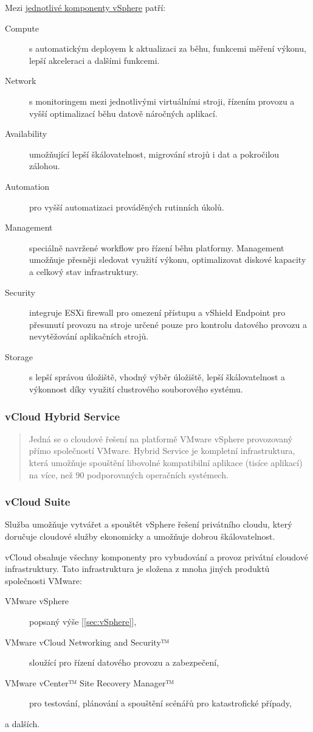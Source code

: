 Mezi \href{http://www.vmware.com/products/vsphere/features.html}{jednotlivé komponenty vSphere} patří:
\begin{description}
	\item[Compute] s automatickým deployem k aktualizaci za běhu, funkcemi měření výkonu, lepší akceleraci a dalšími funkcemi.
	\item[Network] s monitoringem mezi jednotlivými virtuálními stroji, řízením provozu a vyšší optimalizací běhu datově náročných aplikací.
	\item[Availability] umožňující lepší škálovatelnost, migrování strojů i dat a pokročilou zálohou.
	\item[Automation] pro vyšší automatizaci prováděných rutinních úkolů.
	\item[Management] speciálně navržené workflow pro řízení běhu platformy. Management umožňuje přesněji sledovat využití výkonu, optimalizovat diskové kapacity a celkový stav infrastruktury.
	\item[Security] integruje ESXi firewall pro omezení přístupu a vShield Endpoint pro přesunutí provozu na stroje určené pouze pro kontrolu datového provozu a nevytěžování aplikačních strojů.
	\item[Storage] s lepší správou úložiště, vhodný výběr úložiště, lepší škálovatelnost a výkonnost díky využití clustrového souborového systému.
\end{description}

\subsubsection{vCloud Hybrid Service}
\begin{quote}
Jedná se o cloudové řešení na platformě VMware vSphere provozovaný přímo společností VMware. Hybrid Service je kompletní infrastruktura, která umožňuje spouštění libovolné kompatibilní aplikace (tisíce aplikací) na více, než 90 podporovaných operačních systémech.\cite{vmware:hybridService}
\end{quote}

\subsubsection{vCloud Suite}
Služba umožňuje vytvářet a spouštět vSphere řešení privátního cloudu, který doručuje cloudové služby ekonomicky a umožňuje dobrou škálovatelnost.\nocite{vmware:vCloudDatasheet}

vCloud obsahuje všechny komponenty pro vybudování a provoz privátní cloudové infrastruktury. Tato infrastruktura je složena z mnoha jiných produktů společnosti VMware:
\begin{description}
	\item[VMware vSphere] popsaný výše [\ref{sec:vSphere}],
	\item[VMware vCloud Networking and Security™] sloužící pro řízení datového provozu a zabezpečení,
	\item[VMware vCenter™ Site Recovery Manager™] pro testování, plánování a spouštění scénářů pro katastrofické případy,
	\item[a dalších.]
\end{description}

